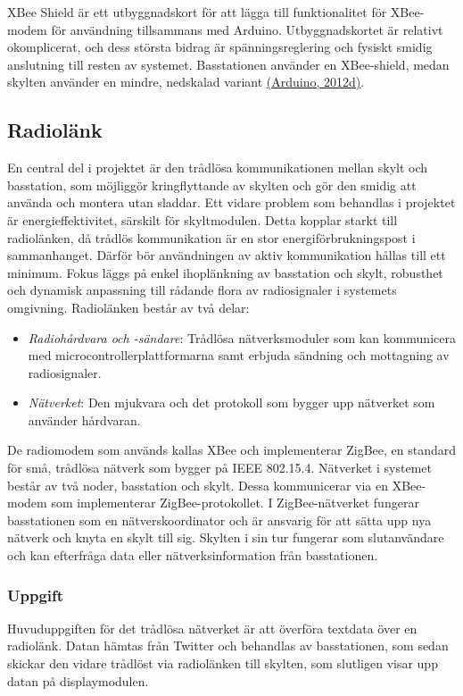 \documentclass[a4paper,11pt]{article}
\begin{document}
XBee Shield är ett utbyggnadskort för att lägga till funktionalitet för XBee-modem för användning tillsammans med Arduino. Utbyggnadskortet är relativt okomplicerat, och dess största bidrag är spänningsreglering och fysiskt smidig anslutning till resten av systemet. Basstationen använder en XBee-shield, medan skylten använder en mindre, nedskalad variant \hyperref[arduino]{(Arduino, 2012d)}.

\subsection{Radiolänk}
En central del i projektet är den trådlösa kommunikationen mellan skylt och basstation, som möjliggör kringflyttande av skylten och gör den smidig att använda och montera utan sladdar. Ett vidare problem som behandlas i projektet är energieffektivitet, särskilt för skyltmodulen. Detta kopplar starkt till radiolänken, då trådlös kommunikation är en stor energiförbrukningspost i sammanhanget. Därför bör användningen av aktiv kommunikation hållas till ett minimum. Fokus läggs på enkel ihoplänkning av basstation och skylt, robusthet och dynamisk anpassning till rådande flora av radiosignaler i systemets omgivning. Radiolänken består av två delar:
	
	\begin{itemize}
	\item {\it Radiohårdvara och -sändare}: Trådlösa nätverksmoduler som kan kommunicera med microcontrollerplattformarna samt erbjuda sändning och mottagning av radiosignaler.
    	\item {\it Nätverket}: Den mjukvara och det protokoll som bygger upp nätverket som använder hårdvaran.
	\end{itemize}

De radiomodem som används kallas XBee och implementerar ZigBee, en standard för små, trådlösa nätverk som bygger på IEEE 802.15.4. Nätverket i systemet består av två noder, basstation och skylt. Dessa kommunicerar via en XBee-modem som implementerar ZigBee-protokollet. I ZigBee-nätverket fungerar basstationen som en nätverskoordinator och är ansvarig för att sätta upp nya nätverk och knyta en skylt till sig. Skylten i sin tur fungerar som slutanvändare och kan efterfråga data eller nätverksinformation från basstationen.

\subsubsection{Uppgift}
Huvuduppgiften för det trådlösa nätverket är att överföra textdata över en radiolänk. Datan hämtas från Twitter och behandlas av basstationen, som sedan skickar den vidare trådlöst via radiolänken till skylten, som slutligen visar upp datan på displaymodulen. \\
\end{document}
